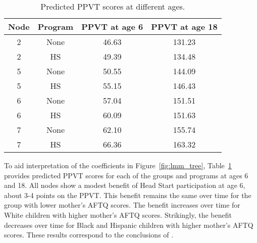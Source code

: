 \documentclass[doc,floatsintext,natbib]{apa7}
\begin{document}
\begin{table}

\caption{\label{tab:predictions}Predicted PPVT scores at different ages.}
\begin{tabular}[t]{cccc}
\toprule
Node & Program & PPVT at age 6 & PPVT at age 18\\
\midrule
2 & None & 46.63 & 131.23\\
2 & HS & 49.39 & 134.48\\
5 & None & 50.55 & 144.09\\
5 & HS & 55.15 & 146.43\\
6 & None & 57.04 & 151.51\\
6 & HS & 60.09 & 151.63\\
7 & None & 62.10 & 155.74\\
7 & HS & 66.36 & 163.32\\
\bottomrule
\end{tabular}
\end{table}
To aid interpretation of the coefficients in Figure~\ref{fig:lmm_tree}, Table~\ref{tab:predictions} provides predicted PPVT scores for each of the groups and programs at ages 6  and 18. All nodes show a modest benefit of Head Start participation at age 6, about 3-4 points on the PPVT. This benefit remains the same over time for the group with lower mother's AFTQ scores. The benefit increases over time for White children with higher mother's AFTQ scores. Strikingly, the benefit decreases over time for Black and Hispanic children with higher mother's AFTQ scores. These results correspond to the conclusions of \cite{Demi09}. 
\end{document}
